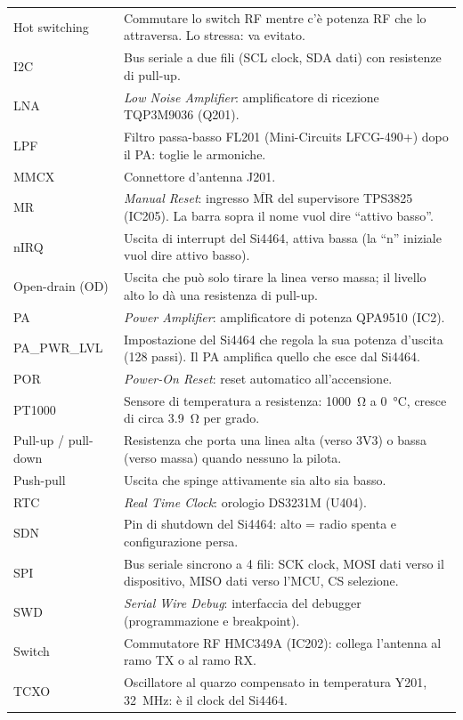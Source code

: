 \begin{xltabular}{\linewidth}{@{}L{26mm}Y@{}}
Hot switching & Commutare lo switch RF mentre c'è potenza RF che lo attraversa. Lo stressa: va evitato.\\
I2C & Bus seriale a due fili (SCL clock, SDA dati) con resistenze di pull-up.\\
LNA & \emph{Low Noise Amplifier}: amplificatore di ricezione TQP3M9036 (Q201).\\
LPF & Filtro passa-basso FL201 (Mini-Circuits LFCG-490+) dopo il PA: toglie le armoniche.\\
MMCX & Connettore d'antenna J201.\\
MR & \emph{Manual Reset}: ingresso \(\overline{\mathrm{MR}}\) del supervisore TPS3825 (IC205). La barra sopra il nome vuol dire \enquote{attivo basso}.\\
nIRQ & Uscita di interrupt del Si4464, attiva bassa (la \enquote{n} iniziale vuol dire attivo basso).\\
Open-drain (OD) & Uscita che può solo tirare la linea verso massa; il livello alto lo dà una resistenza di pull-up.\\
PA & \emph{Power Amplifier}: amplificatore di potenza QPA9510 (IC2).\\
PA\_PWR\_LVL & Impostazione del Si4464 che regola la sua potenza d'uscita (128 passi). Il PA amplifica quello che esce dal Si4464.\\
POR & \emph{Power-On Reset}: reset automatico all'accensione.\\
PT1000 & Sensore di temperatura a resistenza: \SI{1000}{\ohm} a \SI{0}{\celsius}, cresce di circa \SI{3.9}{\ohm} per grado.\\
Pull-up / pull-down & Resistenza che porta una linea alta (verso 3V3) o bassa (verso massa) quando nessuno la pilota.\\
Push-pull & Uscita che spinge attivamente sia alto sia basso.\\
RTC & \emph{Real Time Clock}: orologio DS3231M (U404).\\
SDN & Pin di shutdown del Si4464: alto = radio spenta e configurazione persa.\\
SPI & Bus seriale sincrono a 4 fili: SCK clock, MOSI dati verso il dispositivo, MISO dati verso l'MCU, CS selezione.\\
SWD & \emph{Serial Wire Debug}: interfaccia del debugger (programmazione e breakpoint).\\
Switch & Commutatore RF HMC349A (IC202): collega l'antenna al ramo TX o al ramo RX.\\
TCXO & Oscillatore al quarzo compensato in temperatura Y201, \SI{32}{\mega\hertz}: è il clock del Si4464.\\

\end{xltabular}
